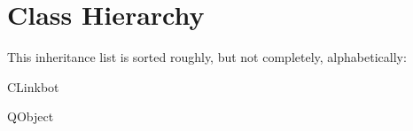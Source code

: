 \section{Class Hierarchy}
This inheritance list is sorted roughly, but not completely, alphabetically\-:\begin{DoxyCompactList}
\item C\-Linkbot\begin{DoxyCompactList}
\item {}
\end{DoxyCompactList}
\item Q\-Object\begin{DoxyCompactList}
\item {}
\item {}
\end{DoxyCompactList}
\end{DoxyCompactList}

